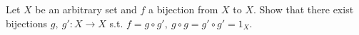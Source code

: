 Let $X$ be an arbitrary set and $f$ a bijection from $X$ to $X$. Show that there exist bijections $g,\ g':X\to X$ s.t. $f=g\circ g',\ g\circ g=g'\circ g'=1_X$.